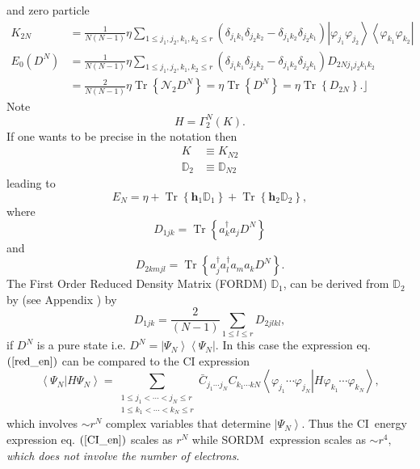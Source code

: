 \documentclass[aps,preprint]{revtex4}%
\begin{document}
and zero particle
\begin{align}
K_{2N}  &  =\frac{1}{N\left(  N-1\right)  }\eta\sum_{1\leq j_{1},j_{2}%
,k_{1},k_{2}\leq r}\left(  \delta_{j_{1}k_{1}}\delta_{j_{2}k_{2}}%
-\delta_{j_{1}k_{2}}\delta_{j_{2}k_{1}}\right)  \left\vert \varphi_{j_{1}%
}\varphi_{j_{2}}\right\rangle \left\langle \varphi_{k_{1}}\varphi_{k_{2}%
}\right\vert \nonumber\\
E_{0}\left(  D^{N}\right)   &  =\frac{1}{N\left(  N-1\right)  }\eta\sum_{1\leq
j_{1},j_{2},k_{1},k_{2}\leq r}\left(  \delta_{j_{1}k_{1}}\delta_{j_{2}k_{2}%
}-\delta_{j_{1}k_{2}}\delta_{j_{2}k_{1}}\right)  D_{2Nj_{1}j_{2}k_{1}k_{2}%
}\nonumber\\
&  =\frac{2}{N\left(  N-1\right)  }\eta\operatorname{Tr}\left\{
\mathcal{N}_{2}D^{N}\right\}  =\eta\operatorname{Tr}\left\{  D^{N}\right\}
=\eta\operatorname{Tr}\left\{  D_{2N}\right\}  .\rfloor
\end{align}
Note
\begin{equation}
H=\Gamma_{2}^{N}\left(  K\right)  .
\end{equation}
If one wants to be precise in the notation then
\begin{align}
K  &  \equiv K_{N2}\\
\mathbb{D}_{2}  &  \equiv\mathbb{D}_{N2}%
\end{align}
leading to
\begin{equation}
E_{N}=\eta+\operatorname{Tr}\left\{  \mathbf{h}_{1}\mathbb{D}_{1}\right\}
+\operatorname{Tr}\left\{  \mathbf{h}_{2}\mathbb{D}_{2}\right\}  ,
\label{red_en}%
\end{equation}
where
\begin{equation}
D_{1jk}=\operatorname{Tr}\left\{  a_{k}^{\dagger}a_{j}D^{N}\right\}
\end{equation}
and
\begin{equation}
D_{2kmjl}=\operatorname{Tr}\left\{  a_{j}^{\dagger}a_{l}^{\dagger}a_{m}%
a_{k}D^{N}\right\}  .
\end{equation}
The First Order Reduced Density Matrix (FORDM) $\mathbb{D}_{1}$, can be
derived from $\mathbb{D}_{2}$ by (see Appendix ) by
\begin{equation}
D_{1jk}=\frac{2}{\left(  N-1\right)  }\sum_{1\leq l\leq r}D_{2jlkl},
\end{equation}
if $D^{N}$ is a pure state i.e. $D^{N}=\left\vert \Psi_{N}\right\rangle
\left\langle \Psi_{N}\right\vert .$ In this case the expression eq. $\left(
\ref{red_en}\right)  $ can be compared to the CI expression
\begin{equation}
\left\langle \Psi_{N}\left\vert H\Psi_{N}\right.  \right\rangle =\sum
_{\substack{1\leq j_{1}<\cdots<j_{N}\leq r\\1\leq k_{1}<\cdots<k_{N}\leq
r}}\bar{C}_{j_{1}\cdots j_{N}}C_{k_{1}\cdots kN}\left\langle \varphi_{j_{1}%
}\cdots\varphi_{j_{N}}\left\vert H\varphi_{k_{1}}\cdots\varphi_{k_{N}}\right.
\right\rangle , \label{CI_en}%
\end{equation}
which involves $\sim r^{N}$ complex variables that determine $\left\vert
\Psi_{N}\right\rangle .$ Thus the CI\ energy expression eq. $\left(
\ref{CI_en}\right)  $ scales as $r^{N}$ while SORDM\ expression scales as
$\sim r^{4},$ \emph{which does not involve the number of electrons}.
\end{document}
